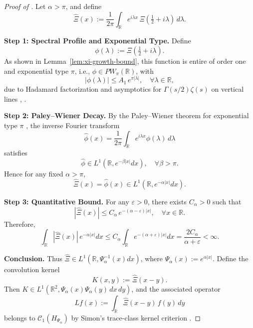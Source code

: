 \begin{proof}[Proof of ]
Let \( \alpha > \pi \), and define
\[
\widehat{\Xi}(x) := \frac{1}{2\pi} \int_{\mathbb{R}} e^{i\lambda x} \, \Xi\left( \tfrac{1}{2} + i\lambda \right)\, d\lambda.
\]

\medskip
\noindent\textbf{Step 1: Spectral Profile and Exponential Type.}
Define
\[
\phi(\lambda) := \Xi\left( \tfrac{1}{2} + i\lambda \right).
\]
As shown in Lemma~\ref{lem:xi-growth-bound}, this function is entire of order one and exponential type \( \pi \), i.e., \( \phi \in PW_\pi(\mathbb{R}) \), with
\[
|\phi(\lambda)| \le A_1\, e^{\pi |\lambda|}, \quad \forall \lambda \in \mathbb{R},
\]
due to Hadamard factorization and asymptotics for \( \Gamma(s/2)\zeta(s) \) on vertical lines \cite[Ch.~3]{Levin1996EntireLectures}, \cite[Ch.~2]{Titchmarsh1986Zeta}.

\medskip
\noindent\textbf{Step 2: Paley–Wiener Decay.}
By the Paley–Wiener theorem for exponential type \( \pi \) \cite[Thm.~3.2.4]{Levin1996EntireLectures}, the inverse Fourier transform
\[
\widehat{\phi}(x) = \frac{1}{2\pi} \int_{\mathbb{R}} e^{i\lambda x} \phi(\lambda)\, d\lambda
\]
satisfies
\[
\widehat{\phi} \in L^1(\mathbb{R}, e^{-\beta |x|} dx), \quad \forall \beta > \pi.
\]
Hence for any fixed \( \alpha > \pi \),
\[
\widehat{\Xi}(x) = \widehat{\phi}(x) \in L^1(\mathbb{R}, e^{-\alpha |x|} dx).
\]

\medskip
\noindent\textbf{Step 3: Quantitative Bound.}
For any \( \varepsilon > 0 \), there exists \( C_\alpha > 0 \) such that
\[
|\widehat{\Xi}(x)| \le C_\alpha\, e^{-(\alpha - \varepsilon)|x|}, \quad \forall x \in \mathbb{R}.
\]
Therefore,
\[
\int_{\mathbb{R}} |\widehat{\Xi}(x)|\, e^{-\alpha |x|} dx
\le C_\alpha \int_{\mathbb{R}} e^{-(\alpha + \varepsilon)|x|} dx
= \frac{2 C_\alpha}{\alpha + \varepsilon} < \infty.
\]

\medskip
\noindent\textbf{Conclusion.}
Thus \( \widehat{\Xi} \in L^1(\mathbb{R}, \Psi_\alpha^{-1}(x) dx) \), where \( \Psi_\alpha(x) := e^{\alpha |x|} \). Define the convolution kernel
\[
K(x,y) := \widehat{\Xi}(x - y).
\]
Then \( K \in L^1(\mathbb{R}^2, \Psi_\alpha(x)\Psi_\alpha(y)\, dx\,dy) \), and the associated operator
\[
L f(x) := \int_{\mathbb{R}} \widehat{\Xi}(x - y)\, f(y)\, dy
\]
belongs to \( \mathcal{C}_1(H_{\Psi_\alpha}) \) by Simon’s trace-class kernel criterion \cite[Thm.~4.2]{Simon2005TraceIdeals}.
\end{proof}
